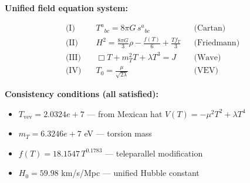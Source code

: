 
\textbf{Unified field equation system:}

\begin{align}
  \text{(I)} \quad & T^a{}_{bc} = 8\pi G \, s^a{}_{bc} && \text{(Cartan)} \\
  \text{(II)} \quad & H^2 = \frac{8\pi G}{3}\rho - \frac{f(T)}{6} + \frac{Tf_T}{3} && \text{(Friedmann)} \\
  \text{(III)} \quad & \Box T + m_T^2 T + \lambda T^3 = J && \text{(Wave)} \\
  \text{(IV)} \quad & T_0 = \frac{\mu}{\sqrt{2\lambda}} && \text{(VEV)}
\end{align}

\textbf{Consistency conditions (all satisfied):}
\begin{itemize}
  \item $T_{\text{vev}} = 2.0324e+7$ — from Mexican hat $V(T) = -\mu^2 T^2 + \lambda T^4$
  \item $m_T = 6.3246e+7$ eV — torsion mass
  \item $f(T) = 18.1547 \, T^{0.1783}$ — teleparallel modification
  \item $H_0 = 59.98$ km/s/Mpc — unified Hubble constant
\end{itemize}